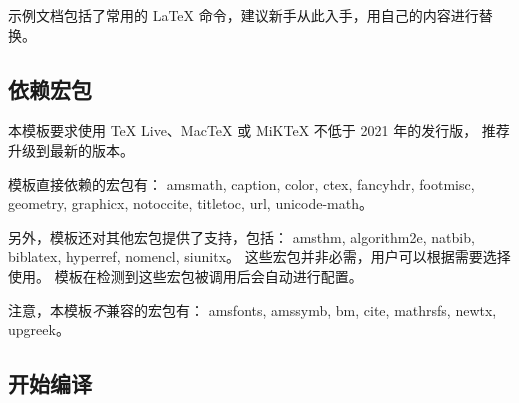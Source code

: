 \documentclass[a4paper]{ltxdoc}
\DeclareRobustCommand\pkg{\textsf}
\begin{document}
示例文档包括了常用的 \LaTeX{} 命令，建议新手从此入手，用自己的内容进行替换。


\subsection{依赖宏包}

本模板要求使用 TeX Live、MacTeX 或 MiKTeX 不低于 2021 年的发行版，
推荐升级到最新的版本。

模板直接依赖的宏包有：
\pkg{amsmath},
\pkg{caption},
\pkg{color},
\pkg{ctex},
\pkg{fancyhdr},
\pkg{footmisc},
\pkg{geometry},
\pkg{graphicx},
\pkg{notoccite},
\pkg{titletoc},
\pkg{url},
\pkg{unicode-math}。

另外，模板还对其他宏包提供了支持，包括：
\pkg{amsthm},
\pkg{algorithm2e},
\pkg{natbib},
\pkg{biblatex},
\pkg{hyperref},
\pkg{nomencl},
\pkg{siunitx}。
这些宏包并非必需，用户可以根据需要选择使用。
模板在检测到这些宏包被调用后会自动进行配置。

注意，本模板\emph{不}兼容的宏包有：
\pkg{amsfonts},
\pkg{amssymb},
\pkg{bm},
\pkg{cite},
\pkg{mathrsfs},
\pkg{newtx},
\pkg{upgreek}。


\subsection{开始编译}
\end{document}
